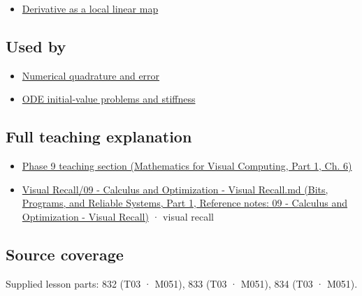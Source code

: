 \begin{itemize}
\tightlist
\item
  \hyperref[appendix-7bc181935c42]{Derivative as a local linear map}
\end{itemize}

\subsection{Used by}\label{appendix-1a50e72435c2-used-by}

\hypertarget{appendix-1a50e72435c2-used-by}{}

\begin{itemize}
\tightlist
\item
  \hyperref[appendix-80521eae6b71]{Numerical quadrature and error}
\item
  \hyperref[appendix-e8ab9836882e]{ODE initial-value problems and stiffness}
\end{itemize}

\subsection{Full teaching explanation}\label{appendix-1a50e72435c2-full-teaching-explanation}

\hypertarget{appendix-1a50e72435c2-full-teaching-explanation}{}

\begin{itemize}
\tightlist
\item
  \href{../02-Mathematics-for-Visual-Computing-P01/main.pdf\#02-foundations-ii-ch022-integration-and-quadrature}{Phase 9 teaching section (Mathematics for Visual Computing, Part 1, Ch. 6)}
\item
  \href{../01-Bits-Programs-and-Reliable-Systems-P01/main.pdf\#appendix-adf48f5dc5c1}{Visual Recall/09 - Calculus and Optimization - Visual Recall.md (Bits, Programs, and Reliable Systems, Part 1, Reference notes: 09 - Calculus and Optimization - Visual Recall)} · visual recall
\end{itemize}

\subsection{Source coverage}\label{appendix-1a50e72435c2-source-coverage}

\hypertarget{appendix-1a50e72435c2-source-coverage}{}

Supplied lesson parts: 832 (T03 · M051), 833 (T03 · M051), 834 (T03 · M051).
